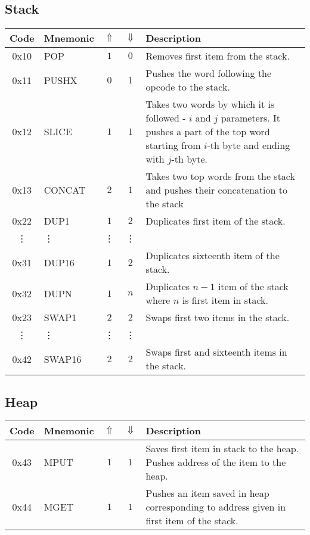 \documentclass[12pt,a4paper]{article}
\begin{document}
\subsection{Stack}
\begin{tabularx}{\textwidth}{ c l c c p{7cm} }
\textbf{Code} & \textbf{Mnemonic} & \textbf{$\Uparrow$} & \textbf{$\Downarrow$} & \textbf{Description} \\
\hline
0x10 & POP & $1$ & $0$ & Removes first item from the stack. \\
\hline
0x11 & PUSHX & $0$ & $1$ & Pushes the word following the opcode to the stack. \\
\hline
0x12 & SLICE & $1$ & $1$ & Takes two words by which it is followed - $i$ and $j$ parameters. It pushes a part of the top word starting from $i$-th byte and ending with $j$-th byte.   \\
\hline
0x13 & CONCAT & $2$ & $1$ & Takes two top words from the stack and pushes their concatenation to the stack \\
\hline
0x22 & DUP1 & $1$ & $2$ & Duplicates first item of the stack. \\
\vdots & \vdots & \vdots & \vdots \\
0x31 & DUP16 & $1$ & $2$ & Duplicates sixteenth item of the stack. \\
\hline
0x32 & DUPN & $1$ & $n$ & Duplicates $n-1$ item of the stack where $n$ is first item in stack. \\
\hline
0x23 & SWAP1 & $2$ & $2$ & Swaps first two items in the stack. \\
\vdots & \vdots & \vdots & \vdots \\
0x42 & SWAP16 & $2$ & $2$ & Swaps first and sixteenth items in the stack. \\
\hline
\end{tabularx}

\subsection{Heap}
\begin{tabularx}{\textwidth}{ c l c c p{7cm} }
\textbf{Code} & \textbf{Mnemonic} & \textbf{$\Uparrow$} & \textbf{$\Downarrow$} & \textbf{Description} \\
\hline
0x43 & MPUT & $1$ & $1$ & Saves first item in stack to the heap. Pushes address of the item to the heap. \\
\hline
0x44 & MGET & $1$ & $1$ & Pushes an item saved in heap corresponding to address given in first item of the stack.  \\
\hline
\end{tabularx}
\end{document}
